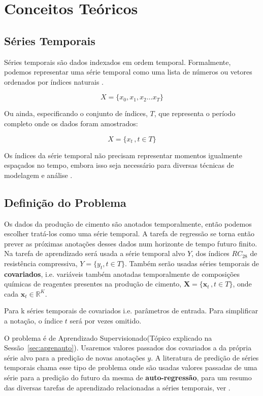 \chapter{Conceitos Teóricos}
\label{cap:conceitos}




\section{Séries Temporais}

Séries temporais são dados indexados em ordem temporal. Formalmente, podemos
representar uma série temporal como uma lista de números ou vetores ordenados
por índices naturais \citep{spec}.

\[
X = \{x_0,x_1,x_2 \dots x_T\}
\]

Ou ainda, especificando o conjunto de índices, $T$, que representa o período
completo onde os dados foram amostrados:


\[
  X = \{x_t \, , t \in T\}
\]


Os índices da série temporal não precisam representar momentos igualmente
espaçados no tempo, embora isso seja necessário para diversas técnicas de
modelagem e análise \citep{ARIMA_LSTM}.


\section{Definição do Problema}


Os dados da produção de cimento são anotados temporalmente, então podemos escolher
tratá-los como uma série temporal. A tarefa de regressão se torna então prever as próximas anotações desses
dados num horizonte de tempo futuro finito.
Na tarefa de aprendizado será usada a série temporal alvo $Y$, dos índices
$RC_{28}$ de resistência compressiva, $Y = \{y_t , t \in T \}$.
Também serão usadas séries temporais de
\textbf{covariados}, i.e. variáveis também anotadas temporalmente de composições
químicas de reagentes presentes na produção de cimento, $\textbf{X} = \{ \textbf{x}_t  \, , t
\in T  \}$, onde cada $\textbf{x}_t \in \mathbb{R}^K$.

Para k séries temporais de covariados i.e. parâmetros de
entrada. Para simplificar a notação, o índice $t$ será por vezes omitido.

O problema é de Aprendizado Supervisionado(Tópico explicado na
Sessão~\ref{sec:aprenauto}). Usaremos valores passados dos covariados a da
própria série alvo para a predição de novas anotações $y$. A literatura de predição de séries
temporais chama esse tipo de problema onde são usadas valores passadas de uma série
para a predição do futuro da mesma de \textbf{auto-regressão}, para um resumo
das diversas tarefas de aprendizado relacionadas a séries temporais, ver \cite{gluonts}.


